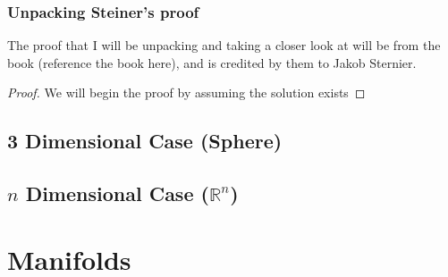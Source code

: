 \documentclass[a4paper]{book}
\begin{document}
\subsection{Unpacking Steiner's proof}
The proof that I will be unpacking and taking a closer look at will be from the book (reference the book here), and is credited by them to Jakob Sternier.
\begin{proof}
We will begin the proof by assuming the solution exists
\end{proof}

\section{3 Dimensional Case (Sphere)}

\section{$n$ Dimensional Case ($\mathbb{R}^n$)}

\chapter{Manifolds}
\end{document}
